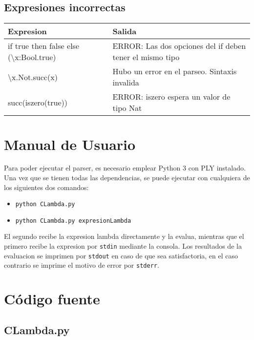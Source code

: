\documentclass{article}
\theoremstyle{definition}
\theoremstyle{remark}
\begin{document}
\subsection{Expresiones incorrectas}

\begin{tabular}{|l|l|}
\hline
Expresion                                            & Salida                                                   \\ \hline
if true then false else (\textbackslash x:Bool.true) & ERROR: Las dos opciones del if deben tener el mismo tipo \\ \hline
\textbackslash x.Not.succ(x)                         & Hubo un error en el parseo. Sintaxis invalida            \\ \hline
succ(iszero(true))                                   & ERROR: iszero espera un valor de tipo Nat                \\ \hline
\end{tabular}

\section{Manual de Usuario}

Para poder ejecutar el parser, es necesario emplear Python 3 con PLY instalado. Una vez que se tienen todas las dependencias, se puede ejecutar con cualquiera de los siguientes dos comandos:

\begin{itemize}
	\item \texttt{python CLambda.py}
	\item \texttt{python CLambda.py expresionLambda}
\end{itemize}

El segundo recibe la expresion lambda directamente y la evalua, mientras que el primero recibe la expresion por \texttt{stdin} mediante la consola. Los resultados de la evaluacion se imprimen por \texttt{stdout} en caso de que sea satisfactoria, en el caso contrario se imprime el motivo de error por \texttt{stderr}.

\section{Código fuente}

\subsection{CLambda.py}
\begin{small}
  
\end{small}
\end{document}
